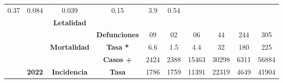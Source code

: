 \begin{tabular}{lccc|cccccc|}
		\multicolumn{1}{c|}{\cellcolor[HTML]{E2EFDA}0.37} &
		\multicolumn{1}{c|}{\cellcolor[HTML]{E2EFDA}0.084} &
		\multicolumn{1}{c|}{\cellcolor[HTML]{E2EFDA}0.039} &
		\multicolumn{1}{c|}{\cellcolor[HTML]{E2EFDA}0.15} &
		\multicolumn{1}{c|}{\cellcolor[HTML]{E2EFDA}3.9} &
		\cellcolor[HTML]{E2EFDA}0.54 \\ \cline{4-10} 
		\multicolumn{1}{l|}{} &
		\multicolumn{1}{c|}{\cellcolor[HTML]{E2EFDA}} &
		\multicolumn{1}{c|}{\multirow{-2}{*}{\cellcolor[HTML]{E2EFDA}\textbf{Letalidad}}} &
		\cellcolor[HTML]{E2EFDA} &
		\multicolumn{1}{c|}{\cellcolor[HTML]{E2EFDA}} &
		\multicolumn{1}{c|}{\cellcolor[HTML]{E2EFDA}} &
		\multicolumn{1}{c|}{\cellcolor[HTML]{E2EFDA}} &
		\multicolumn{1}{c|}{\cellcolor[HTML]{E2EFDA}} &
		\multicolumn{1}{c|}{\cellcolor[HTML]{E2EFDA}} &
		\cellcolor[HTML]{E2EFDA} \\ \cline{3-3}
		\multicolumn{1}{l|}{} &
		\multicolumn{1}{c|}{\cellcolor[HTML]{E2EFDA}} &
		\multicolumn{1}{c|}{\cellcolor[HTML]{E2EFDA}} &
		\multirow{-2}{*}{\cellcolor[HTML]{E2EFDA}\textbf{Defunciones}} &
		\multicolumn{1}{c|}{\multirow{-2}{*}{\cellcolor[HTML]{E2EFDA}09}} &
		\multicolumn{1}{c|}{\multirow{-2}{*}{\cellcolor[HTML]{E2EFDA}02}} &
		\multicolumn{1}{c|}{\multirow{-2}{*}{\cellcolor[HTML]{E2EFDA}06}} &
		\multicolumn{1}{c|}{\multirow{-2}{*}{\cellcolor[HTML]{E2EFDA}44}} &
		\multicolumn{1}{c|}{\multirow{-2}{*}{\cellcolor[HTML]{E2EFDA}244}} &
		\multirow{-2}{*}{\cellcolor[HTML]{E2EFDA}305} \\ \cline{4-10} 
		\multicolumn{1}{l|}{} &
		\multicolumn{1}{c|}{\cellcolor[HTML]{E2EFDA}} &
		\multicolumn{1}{c|}{\multirow{-2}{*}{\cellcolor[HTML]{E2EFDA}\textbf{Mortalidad}}} &
		\cellcolor[HTML]{E2EFDA}\textbf{Tasa *} &
		\multicolumn{1}{c|}{\cellcolor[HTML]{E2EFDA}6.6} &
		\multicolumn{1}{c|}{\cellcolor[HTML]{E2EFDA}1.5} &
		\multicolumn{1}{c|}{\cellcolor[HTML]{E2EFDA}4.4} &
		\multicolumn{1}{c|}{\cellcolor[HTML]{E2EFDA}32} &
		\multicolumn{1}{c|}{\cellcolor[HTML]{E2EFDA}180} &
		\cellcolor[HTML]{E2EFDA}225 \\ \cline{3-10} 
		\multicolumn{1}{l|}{} &
		\multicolumn{1}{c|}{\cellcolor[HTML]{E2EFDA}} &     
		\multicolumn{1}{c|}{\cellcolor[HTML]{E2EFDA}} &
		\cellcolor[HTML]{E2EFDA}\textbf{Casos +} &
		\multicolumn{1}{c|}{\cellcolor[HTML]{E2EFDA}2424} &
		\multicolumn{1}{c|}{\cellcolor[HTML]{E2EFDA}2388} &
		\multicolumn{1}{c|}{\cellcolor[HTML]{E2EFDA}15463} &
		\multicolumn{1}{c|}{\cellcolor[HTML]{E2EFDA}30298} &
		\multicolumn{1}{c|}{\cellcolor[HTML]{E2EFDA}6311} &
		\cellcolor[HTML]{E2EFDA}56884 \\ \cline{4-10} 
		\multicolumn{1}{l|}{} &
		\multicolumn{1}{c|}{\multirow{-6}{*}{\cellcolor[HTML]{E2EFDA}\textbf{2022}}} &
		\multicolumn{1}{c|}{\multirow{-2}{*}{\cellcolor[HTML]{E2EFDA}\textbf{Incidencia}}} &
		\cellcolor[HTML]{E2EFDA}\textbf{Tasa} &
		\multicolumn{1}{c|}{\cellcolor[HTML]{E2EFDA}1786} &
		\multicolumn{1}{c|}{\cellcolor[HTML]{E2EFDA}1759} &
		\multicolumn{1}{c|}{\cellcolor[HTML]{E2EFDA}11391} &
		\multicolumn{1}{c|}{\cellcolor[HTML]{E2EFDA}22319} &
		\multicolumn{1}{c|}{\cellcolor[HTML]{E2EFDA}4649} &
		\cellcolor[HTML]{E2EFDA}41904\\ \cline{2-10} 	
	\end{tabular}